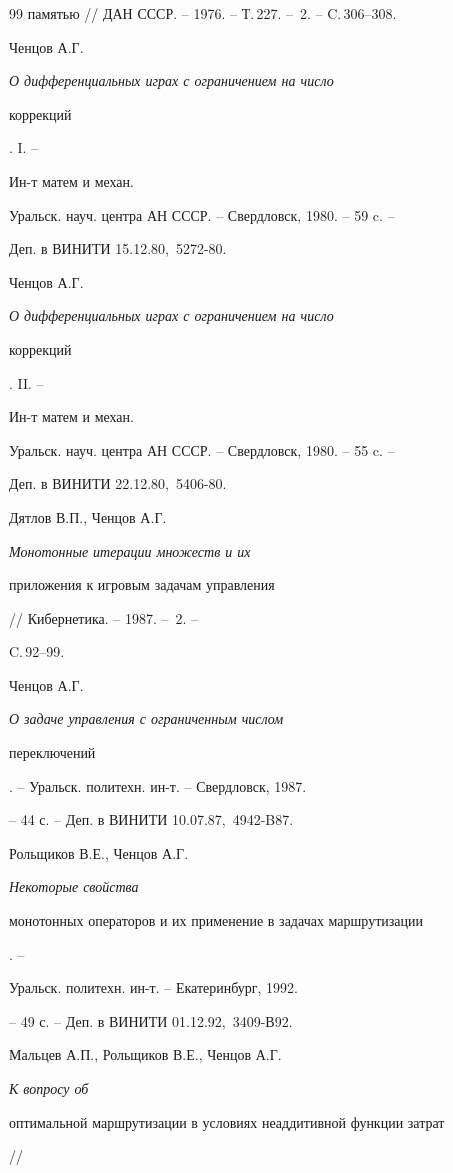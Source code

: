 \begin{thebibliography}{99}
{памятью} // ДАН СССР. -- 1976. -- Т.\,227. -- \No\,2. -- C.\,306--308.





 Ченцов А.Г. {\em О дифференциальных играх с ограничением на число


коррекций}. I. --


Ин-т матем и механ.


Уральск. науч. центра АН СССР. -- Свердловск, 1980. -- 59 c. --


Деп. в ВИНИТИ 15.12.80, \No\,5272-80.





 Ченцов А.Г. {\em О дифференциальных играх с ограничением на число


коррекций}. II. --


Ин-т матем и механ.


Уральск. науч. центра АН СССР. -- Свердловск, 1980. -- 55 c. --


Деп. в ВИНИТИ 22.12.80, \No\,5406-80.





 Дятлов В.П., Ченцов А.Г. {\em Монотонные итерации множеств и их


приложения к игровым задачам управления} // Кибернетика. -- 1987. -- \No\,2. --


C.\,92--99.





 Ченцов А.Г. {\em О задаче управления с ограниченным числом


переключений}. -- Уральск. политехн. ин-т. -- Свердловск, 1987.


-- 44 с. -- Деп. в ВИНИТИ 10.07.87, \No\,4942-B87.





 Рольщиков В.Е., Ченцов А.Г. {\em Некоторые свойства


монотонных операторов и их применение в задачах маршрутизации}. --


Уральск. политехн. ин-т. -- Екатеринбург, 1992.


-- 49 с. -- Деп. в ВИНИТИ 01.12.92, \No\,3409-В92.





 Мальцев А.П., Рольщиков В.Е., Ченцов А.Г. {\em К вопросу об


оптимальной маршрутизации в условиях неаддитивной функции затрат} //



\end{thebibliography}
